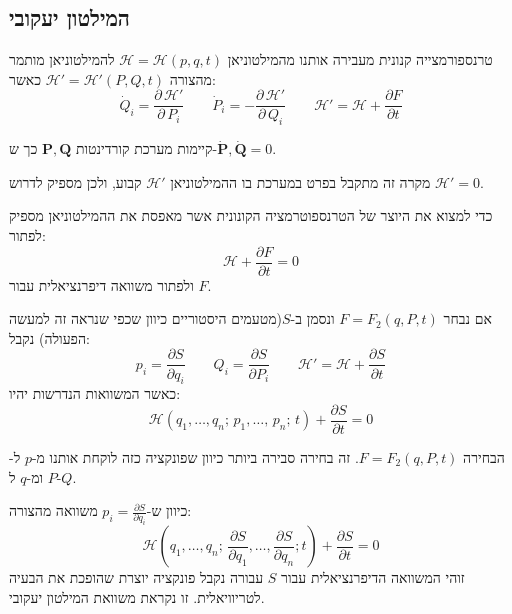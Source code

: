 \documentclass{tstextbook}
\begin{document}
\subsection{המילטון יעקובי}

\begin{reminder}
טרנספורמצייה קנונית מעבירה אותנו מהמילטוניאן \(\mathcal{H}=\mathcal{H}(p,q,t)\) להמילטוניאן מותמר מהצורה \(\mathcal{\mathcal{H}}'=\mathcal{\mathcal{H}}'(P,Q,t)\) כאשר:
$${{\dot{Q}_{i}=\displaystyle\frac{\partial\,\mathcal{\mathcal{H}}'}{\partial\,P_{i}}}}\qquad  {{\dot{P}_{i}=-\displaystyle\frac{\partial\,\mathcal{\mathcal{H}}'}{\partial\,Q_{i}}}}\qquad \mathcal{\mathcal{H}}'=\mathcal{H}+\frac{\partial F}{\partial t}$$

\end{reminder}
\begin{proposition}
קיימות מערכת קורדינטות \(\mathbf{P},\mathbf{Q}\) כך ש-\(\dot{\mathbf{P}},\dot{\mathbf{Q}}=0\). 

\end{proposition}
\begin{remark}
מקרה זה מתקבל בפרט במערכת בו ההמילטוניאן \(\mathcal{H}'\) קבוע, ולכן מספיק לדרוש \(\mathcal{H}'=0\).

\end{remark}
\begin{proposition}
כדי למצוא את היוצר של הטרנספוטרמציה הקונונית אשר מאפסת את ההמילטוניאן מספיק לפתור:
$$\mathcal{H}+\frac{\partial F}{\partial t}=0$$
ולפתור משוואה דיפרנציאלית עבור \(F\). 

\end{proposition}
\begin{corollary}
אם נבחר \(F=F_{2}(q,P,t)\) ונסמן ב-\(S\)(מטעמים היסטוריים כיוון שכפי שנראה זה למעשה הפעולה) נקבל:
$${{p_{i}=\displaystyle\frac{\partial S}{\partial q_{i}}}}\qquad  {{Q_{i}=\displaystyle\frac{\partial S}{\partial P_{i}}}}\qquad {{\mathcal{\mathcal{H}}'=\mathcal{H}+\displaystyle\frac{\partial S}{\partial t}}}$$
כאשר המשוואות הנדרשות יהיו:
$$\mathcal{H}(q_{1},\ldots,q_{n};\,p_{1},\ldots,\,p_{n};\,t)+\frac{\partial S}{\partial t}=0$$

\end{corollary}
\begin{remark}
הבחירה \(F=F_{2}(q,P,t)\). זה בחירה סבירה ביותר כיוון שפונקציה כזה לוקחת אותנו מ-\(p\) ל-\(P\) ומ-\(q\) ל-\(Q\).

\end{remark}
\begin{corollary}
כיוון ש-\(p_{i}=\frac{\partial S}{\partial q_{i}}\) משוואה מהצורה:
$$\mathcal{H}(q_{1},\ldots,q_{n};\,\frac{\partial S}{\partial q_{1}},\ldots,\frac{\partial S}{\partial q_{n}};t)+\frac{\partial S}{\partial t}=0$$
זוהי המשוואה הדיפרנציאלית עבור \(S\) עבורה נקבל פונקציה יוצרת שהופכת את הבעיה לטריוויאלית. זו נקראת משוואת המילטון יעקובי.

\end{corollary}
\end{document}
